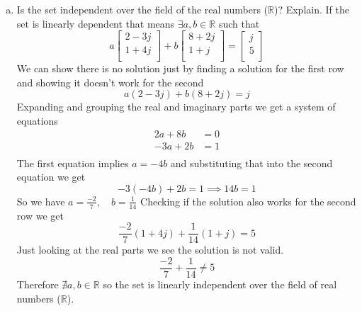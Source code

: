 \documentclass{article}
\begin{document}
\begin{enumerate}[a)]
\item Is the set independent over the field of the real numbers ($\mathbb{R}$)? Explain.
\newline
\newline
If the set is linearly dependent that means $\exists a,b \in \mathbb{R}$ such that
$$
a
\begin{bmatrix}
2-3j \\
1+4j \\
\end{bmatrix}
+b
\begin{bmatrix}
8+2j \\
1+j \\
\end{bmatrix}
=
\begin{bmatrix}
j \\
5 \\
\end{bmatrix}
$$
We can show there is no solution just by finding a solution for the first row and showing it doesn't work for the second
$$ a(2-3j) + b(8+2j) = j$$
Expanding and grouping the real and imaginary parts we get a system of equations
\begin{align*}
2a + 8b &= 0 \\
-3a + 2b &= 1 \\
\end{align*}
The first equation implies $a = -4b$ and substituting that into the second equation we get
$$ -3(-4b) +2b = 1 \implies 14b = 1 $$
So we have $ a = \frac{-2}{7}, \quad b = \frac{1}{14} $
Checking if the solution also works for the second row we get
$$ \frac{-2}{7}(1+4j) + \frac{1}{14}(1+j) = 5 $$
Just looking at the real parts we see the solution is not valid.
$$ \frac{-2}{7} + \frac{1}{14} \neq 5 $$
Therefore $\nexists a,b \in \mathbb{R}$ so the set is linearly independent over the field of real numbers ($\mathbb{R}$).


\end{enumerate}
\end{document}
